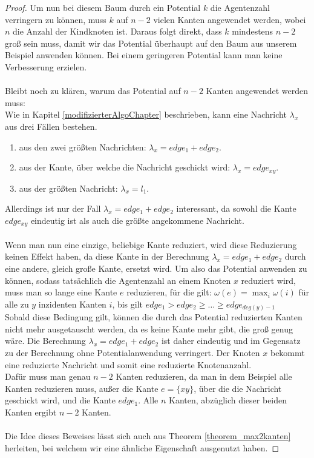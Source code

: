 \begin{proof}
	Um nun bei diesem Baum durch ein Potential $k$ die Agentenzahl verringern zu können, muss $k$ auf $n-2$ vielen Kanten angewendet werden, wobei $n$ die Anzahl der Kindknoten ist. Daraus folgt direkt, dass $k$ mindestens $n-2$ groß sein muss, damit wir das Potential überhaupt auf den Baum aus unserem Beispiel anwenden können. Bei einem geringeren Potential kann man keine Verbesserung erzielen.
	\\
	\\
	Bleibt noch zu klären, warum das Potential auf $n-2$ Kanten angewendet werden muss:
	\\
	Wie in Kapitel \ref{modifizierterAlgoChapter} beschrieben, kann eine Nachricht $\lambda_{x}$ aus drei Fällen bestehen. 
	\begin{enumerate}[label=\alph*)]
		\item aus den zwei größten Nachrichten: $\lambda_{x} = edge_{1} + edge_{2}$.
		\item aus der Kante, über welche die Nachricht geschickt wird: $\lambda_{x} = edge_{xy}$.
		\item aus der größten Nachricht: $\lambda_{x} = l_{1}$.
	\end{enumerate}	
	Allerdings ist nur der Fall $\lambda_{x} = edge_{1} + edge_{2}$ interessant, da sowohl die Kante $edge_{xy}$ eindeutig ist als auch die größte angekommene Nachricht.
	\\
	\\
	Wenn man nun eine einzige, beliebige Kante reduziert, wird diese Reduzierung keinen Effekt haben, da diese Kante in der Berechnung $\lambda_{x} = edge_{1} + edge_{2}$ durch eine andere, gleich große Kante, ersetzt wird. Um also das Potential anwenden zu können, sodass tatsächlich die Agentenzahl an einem Knoten $x$ reduziert wird, muss man so lange eine Kante $e$ reduzieren, für die gilt: $\omega(e) = \max_{i} \omega(i)$ für alle zu $y$ inzidenten Kanten $i$, bis gilt $edge_{1} > edge_{2} \geq \dots \geq edge_{deg(y)-1}$
	\\
	Sobald diese Bedingung gilt, können die durch das Potential reduzierten Kanten nicht mehr ausgetauscht werden, da es keine Kante mehr gibt, die groß genug wäre. Die Berechnung $\lambda_{x} = edge_{1} + edge_{2}$ ist daher eindeutig und im Gegensatz zu der Berechnung ohne Potentialanwendung verringert. Der Knoten $x$ bekommt eine reduzierte Nachricht und somit eine reduzierte Knotenanzahl.
	\\
	Dafür muss man genau $n-2$ Kanten reduzieren, da man in dem Beispiel alle Kanten reduzieren muss, außer die Kante $e = \{xy\}$, über die die Nachricht geschickt wird, und die Kante $edge_{1}$. Alle $n$ Kanten, abzüglich dieser beiden Kanten ergibt $n-2$ Kanten.
	\\
	\\
	Die Idee dieses Beweises lässt sich auch aus Theorem \ref{theorem_max2kanten} herleiten, bei welchem wir eine ähnliche Eigenschaft ausgenutzt haben.
	
\end{proof}


